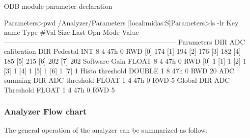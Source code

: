\begin{DoxyItemize}
\begin{DoxyItemize}
\item ODB module parameter declaration 
\begin{DoxyCode}
  Parameters>pwd
 /Analyzer/Parameters
 [local:midas:S]Parameters>ls -lr
 Key name                        Type    #Val  Size  Last Opn Mode Value
 ---------------------------------------------------------------------------
 Parameters                      DIR
     ADC calibration             DIR
         Pedestal                INT     8     4     47h  0   RWD
                                         [0]             174
                                         [1]             194
                                         [2]             176
                                         [3]             182
                                         [4]             185
                                         [5]             215
                                         [6]             202
                                         [7]             202
         Software Gain           FLOAT   8     4     47h  0   RWD
                                         [0]             1
                                         [1]             1
                                         [2]             1
                                         [3]             1
                                         [4]             1
                                         [5]             1
                                         [6]             1
                                         [7]             1
         Histo threshold         DOUBLE  1     8     47h  0   RWD  20
     ADC summing                 DIR
         ADC threshold           FLOAT   1     4     47h  0   RWD  5
     Global                      DIR
        ADC Threshold           FLOAT   1     4     47h  0   RWD  5
\end{DoxyCode}

\end{DoxyItemize}
\end{DoxyItemize}\hypertarget{DataAnalysis_Analyzer_flow_chart}{}\subsubsection{Analyzer Flow chart}\label{DataAnalysis_Analyzer_flow_chart}
The general operation of the analyzer can be summarized as follow:
